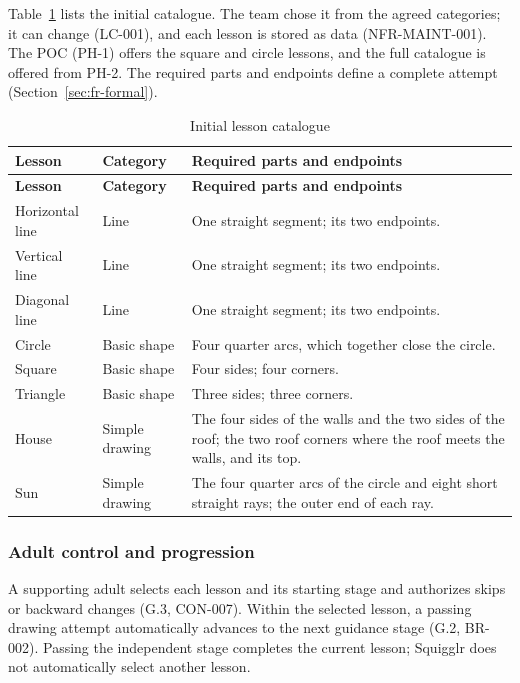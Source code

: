\documentclass[12pt]{article}
\renewcommand{\_}{\textunderscore\allowbreak}%
\begin{document}
Table~\ref{tab:lesson-catalogue} lists the initial catalogue. The team chose it
from the agreed categories; it can change (LC-001), and each lesson is stored
as data (NFR-MAINT-001). The POC (PH-1) offers the square and circle
lessons, and the full catalogue is offered from PH-2. The required parts and
endpoints define a complete attempt (Section~\ref{sec:fr-formal}).

{\small
\begin{longtable}{@{}l l >{\raggedright\arraybackslash}p{}@{}}
\caption{Initial lesson catalogue}\label{tab:lesson-catalogue}\\
\toprule
\textbf{Lesson} & \textbf{Category} & \textbf{Required parts and endpoints}\\
\midrule
\endfirsthead
\toprule
\textbf{Lesson} & \textbf{Category} & \textbf{Required parts and endpoints}\\
\midrule
\endhead
\bottomrule
\endlastfoot
Horizontal line & Line & One straight segment; its two endpoints.\\
Vertical line & Line & One straight segment; its two endpoints.\\
Diagonal line & Line & One straight segment; its two endpoints.\\
Circle & Basic shape & Four quarter arcs, which together close the circle.\\
Square & Basic shape & Four sides; four corners.\\
Triangle & Basic shape & Three sides; three corners.\\
House & Simple drawing & The four sides of the walls and the two sides of the
roof; the two roof corners where the roof meets the walls, and its top.\\
Sun & Simple drawing & The four quarter arcs of the circle and eight short
straight rays; the outer end of each ray.\\
\end{longtable}
}

\subsubsection{Adult control and progression}
A supporting adult selects each lesson and its starting stage and authorizes
skips or backward changes (G.3, CON-007). Within the selected lesson, a passing
drawing attempt automatically advances to the next guidance stage (G.2, BR-002).
Passing the independent stage completes the current lesson; Squigglr does not
automatically select another lesson.
\end{document}

